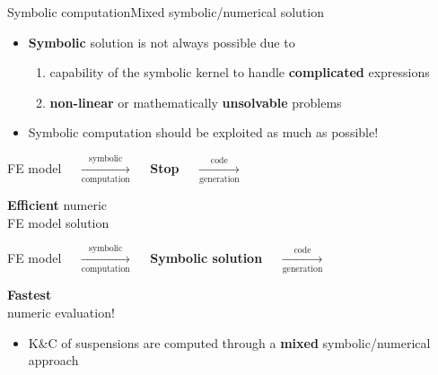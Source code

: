\begin{frame}{Symbolic computation}{Mixed symbolic/numerical solution}
  \begin{itemize}
    \item \textbf{Symbolic} solution is not always possible due to
    \begin{enumerate}
      \item capability of the symbolic kernel to handle \textbf{complicated} expressions
      \item \textbf{non-linear} or mathematically \textbf{unsolvable} problems
    \end{enumerate}
     \item Symbolic computation should be exploited as much as possible!
  \end{itemize}
  \begin{center}\begin{minipage}{1.0\textwidth}\begin{block}{}
    \centering
    FE model $\quad \xrightarrow[\text{computation}]{\text{symbolic}} \quad$ \hspace*{1.05cm}\textcolor{mycolor2}{\textbf{Stop}}\hspace*{1.05cm} $\quad \xrightarrow[\text{generation}]{\text{code}} \quad$ \begin{minipage}[c]{0.27\linewidth}\begin{center}{\textbf{Efficient} numeric \\ FE model solution}\end{center}\end{minipage}
  \end{block}\end{minipage}\end{center}
  \begin{center}\begin{minipage}{1.0\textwidth}\begin{block}{}
    \centering
    FE model $\quad \xrightarrow[\text{computation}]{\text{symbolic}} \quad$ \textcolor{mycolor5}{\textbf{Symbolic solution}} $\quad \xrightarrow[\text{generation}] {\text{code}} \quad$ \begin{minipage}[c]{0.27\linewidth}\begin{center}{\textbf{Fastest} \\ numeric evaluation!}\end{center}\end{minipage}
  \end{block}\end{minipage}\end{center}
  \begin{itemize}
    \item K\&C{} of suspensions are computed through a \textbf{mixed} symbolic/numerical approach
  \end{itemize}
\end{frame}

